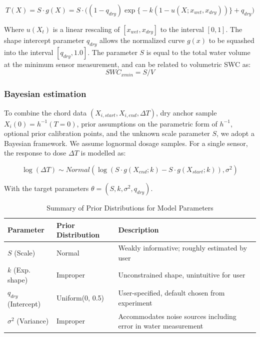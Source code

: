 \documentclass[11pt]{article}
\begin{document}
\begin{equation}
\label{eq:invres}
T(X) = S \cdot g(X) = S \cdot \Big((1-q_{dry})\exp\Big\{-k (1 - u(X; x_{wet}, x_{dry}))\Big\} + q_{dry}\Big)
\end{equation}

Where $u(X_t)$ is a linear rescaling of $[x_{wet}, x_{dry}]$ to the interval $[0, 1]$. The shape intercept parameter $q_{dry}$ allows the normalized curve $g(x)$ to be squashed into the interval $[q_{dry}, 1.0]$. The parameter $S$ is equal to the total water volume at the minimum sensor measurement, and can be related to volumetric SWC as:\\

\begin{equation}
SWC_{xmin} = S / V
\end{equation}

\subsubsection{Bayesian estimation}

To combine the chord data $(X_{i, start}, X_{i, end}, \Delta T)$, dry anchor sample $X_i(0) = h^{-1}(T=0)$, prior assumptions on the parametric form of $h^{-1}$, optional prior calibration points, and the unknown scale parameter $S$, we adopt a Bayesian framework. We assume lognormal dosage samples. For a single sensor, the response to dose $\Delta T$ is modelled as:

\begin{equation}
\log(\Delta T) \sim Normal(\log (S\cdot g(X_{end}; k) - S\cdot g(X_{start}; k)), \sigma^2)
\end{equation}

With the target parameters $\theta = (S, k, \sigma^2, q_{dry})$.

\begin{table}[ht]
    \centering
    \small %
    \caption{Summary of Prior Distributions for Model Parameters}
    \label{tab:priors}
    \begin{tabularx}{\textwidth}{llX} 
        \toprule
        \textbf{Parameter} & \textbf{Prior Distribution} & \textbf{Description} \\
        \midrule
        $S$ (Scale) & Normal & Weakly informative; roughly estimated by user \\
        $k$ (Exp. shape) & Improper & Unconstrained shape, unintuitive for user \\
        $q_{dry}$ (Intercept) & Uniform(0, 0.5) & User-specified, default chosen from experiment \\
        $\sigma^2$ (Variance) & Improper & Accommodates noise sources including error in water measurement \\
        \bottomrule
    \end{tabularx}
\end{table}
\end{document}
